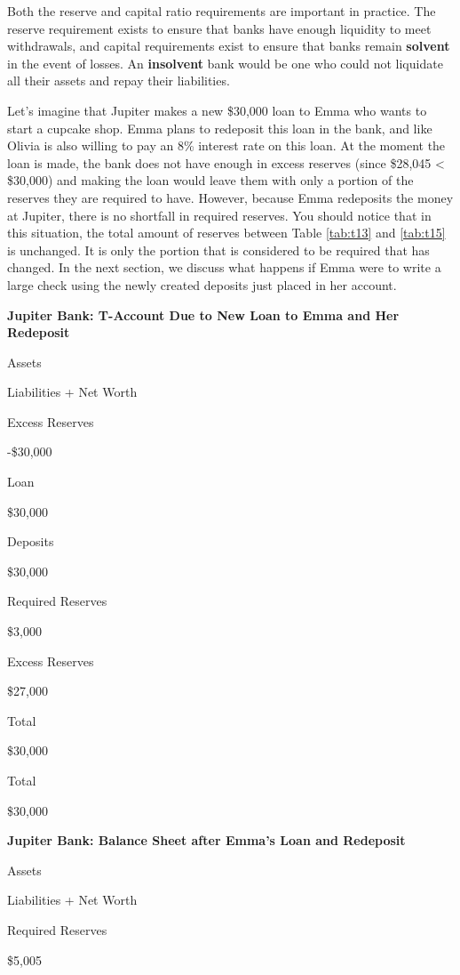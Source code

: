 \documentclass[
]{book}
\begin{document}
Both the reserve and capital ratio requirements are important in practice. The reserve requirement exists to ensure that banks have enough liquidity to meet withdrawals, and capital requirements exist to ensure that banks remain \textbf{solvent} in the event of losses. An \textbf{insolvent} bank would be one who could not liquidate all their assets and repay their liabilities.

Let's imagine that Jupiter makes a new \$30,000 loan to Emma who wants to start a cupcake shop. Emma plans to redeposit this loan in the bank, and like Olivia is also willing to pay an 8\% interest rate on this loan. At the moment the loan is made, the bank does not have enough in excess reserves (since \$28,045 \textless{} \$30,000) and making the loan would leave them with only a portion of the reserves they are required to have. However, because Emma redeposits the money at Jupiter, there is no shortfall in required reserves. You should notice that in this situation, the total amount of reserves between Table \ref{tab:t13} and \ref{tab:t15} is unchanged. It is only the portion that is considered to be required that has changed. In the next section, we discuss what happens if Emma were to write a large check using the newly created deposits just placed in her account.

\label{tab:t14}\textbf{Jupiter Bank: T-Account Due to New Loan to Emma and Her Redeposit}

Assets

Liabilities + Net Worth

Excess Reserves

-\$30,000

Loan

\$30,000

Deposits

\$30,000

Required Reserves

\$3,000

Excess Reserves

\$27,000

Total

\$30,000

Total

\$30,000

\label{tab:t15}\textbf{Jupiter Bank: Balance Sheet after Emma's Loan and Redeposit}

Assets

Liabilities + Net Worth

Required Reserves

\$5,005
\end{document}
